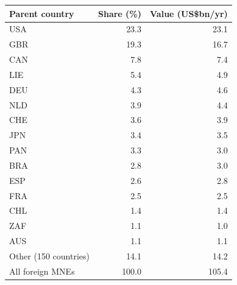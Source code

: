 \begin{tabular}{lrr}
\toprule
Parent country & Share (\%) & Value (US\$bn/yr) \\
\midrule
USA & 23.3 & 23.1 \\
GBR & 19.3 & 16.7 \\
CAN & 7.8 & 7.4 \\
LIE & 5.4 & 4.9 \\
DEU & 4.3 & 4.6 \\
NLD & 3.9 & 4.4 \\
CHE & 3.6 & 3.9 \\
JPN & 3.4 & 3.5 \\
PAN & 3.3 & 3.0 \\
BRA & 2.8 & 3.0 \\
ESP & 2.6 & 2.8 \\
FRA & 2.5 & 2.5 \\
CHL & 1.4 & 1.4 \\
ZAF & 1.1 & 1.0 \\
AUS & 1.1 & 1.1 \\
Other (150 countries) & 14.1 & 14.2 \\
\midrule
All foreign MNEs & 100.0 & 105.4 \\
\bottomrule
\end{tabular}
